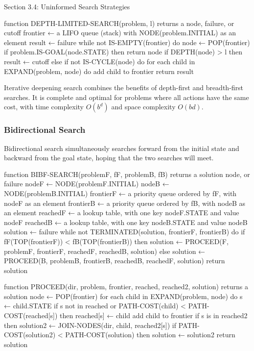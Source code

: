 \begin{notes}{Section 3.4: Uninformed Search Strategies}
\begin{highlight}
\begin{code}
    function DEPTH-LIMITED-SEARCH(problem, l) returns a node, failure, or cutoff
        frontier ← a LIFO queue (stack) with NODE(problem.INITIAL) as an element
        result ← failure
        while not IS-EMPTY(frontier) do
            node ← POP(frontier)
            if problem.IS-GOAL(node.STATE) then return node
            if DEPTH(node) > l then
                result ← cutoff
            else if not IS-CYCLE(node) do
                for each child in EXPAND(problem, node) do
                    add child to frontier
        return result
    \end{code}
    \end{highlight}

    Iterative deepening search combines the benefits of depth-first and breadth-first searches. It is complete and optimal for problems where all actions have the same cost, with time complexity 
    $O(b^d)$ and space complexity $O(bd)$.

    \subsubsection*{Bidirectional Search}

    Bidirectional search simultaneously searches forward from the initial state and backward from the goal state, hoping that the two searches will meet.

    \begin{highlight}
    \begin{code}[Pseudo]
    function BIBF-SEARCH(problemF, fF, problemB, fB) returns a solution node, or failure
        nodeF ← NODE(problemF.INITIAL)
        nodeB ← NODE(problemB.INITIAL)
        frontierF ← a priority queue ordered by fF, with nodeF as an element
        frontierB ← a priority queue ordered by fB, with nodeB as an element
        reachedF ← a lookup table, with one key nodeF.STATE and value nodeF
        reachedB ← a lookup table, with one key nodeB.STATE and value nodeB
        solution ← failure
        while not TERMINATED(solution, frontierF, frontierB) do
            if fF(TOP(frontierF)) < fB(TOP(frontierB)) then
                solution ← PROCEED(F, problemF, frontierF, reachedF, reachedB, solution)
            else
                solution ← PROCEED(B, problemB, frontierB, reachedB, reachedF, solution)
        return solution

    function PROCEED(dir, problem, frontier, reached, reached2, solution) returns a solution
        node ← POP(frontier)
        for each child in EXPAND(problem, node) do
            s ← child.STATE
            if s not in reached or PATH-COST(child) < PATH-COST(reached[s]) then
                reached[s] ← child
                add child to frontier
                if s is in reached2 then
                    solution2 ← JOIN-NODES(dir, child, reached2[s])
                    if PATH-COST(solution2) < PATH-COST(solution) then
                        solution ← solution2
        return solution
    \end{code}
    \end{highlight}


\end{notes}

